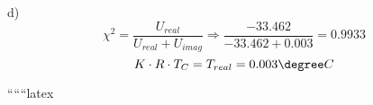 d) \\
\[
\chi^2 = \frac{U_{real}}{U_{real} + U_{imag}} \Rightarrow \frac{-33.462}{-33.462 + 0.003} = 0.9933
\]
\[
K \cdot R \cdot T_C = T_{real} = 0.003 \degree C
\]

``````latex